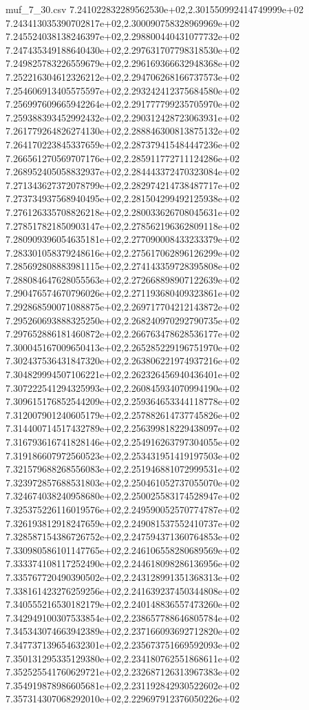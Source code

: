 \begin{filecontents*}{muf_7_30.csv}
7.241022832289562530e+02,2.301550992414749999e+02
7.243413035390702817e+02,2.300090758328969969e+02
7.245524038138246397e+02,2.298800440431077732e+02
7.247435349188640430e+02,2.297631707798318530e+02
7.249825783226559679e+02,2.296169366632948368e+02
7.252216304612326212e+02,2.294706268166737573e+02
7.254606913405575597e+02,2.293242412375684580e+02
7.256997609665942264e+02,2.291777799235705970e+02
7.259388393452992432e+02,2.290312428723063931e+02
7.261779264826274130e+02,2.288846300813875132e+02
7.264170223845337659e+02,2.287379415484447236e+02
7.266561270569707176e+02,2.285911772711124286e+02
7.268952405058832937e+02,2.284443372470323084e+02
7.271343627372078799e+02,2.282974214738487717e+02
7.273734937568940495e+02,2.281504299492125938e+02
7.276126335708826218e+02,2.280033626708045631e+02
7.278517821850903147e+02,2.278562196362809118e+02
7.280909396054635181e+02,2.277090008433233379e+02
7.283301058379248616e+02,2.275617062896126299e+02
7.285692808883981115e+02,2.274143359728395808e+02
7.288084647628055563e+02,2.272668898907122639e+02
7.290476574670796026e+02,2.271193680409323861e+02
7.292868590071088875e+02,2.269717704212143872e+02
7.295260693888325250e+02,2.268240970292790735e+02
7.297652886181460872e+02,2.266763478628536177e+02
7.300045167009650413e+02,2.265285229196751970e+02
7.302437536431847320e+02,2.263806221974937216e+02
7.304829994507106221e+02,2.262326456940436401e+02
7.307222541294325993e+02,2.260845934070994190e+02
7.309615176852544209e+02,2.259364653344118778e+02
7.312007901240605179e+02,2.257882614737745826e+02
7.314400714517432789e+02,2.256399818229438097e+02
7.316793616741828146e+02,2.254916263797304055e+02
7.319186607972560523e+02,2.253431951419197503e+02
7.321579688268556083e+02,2.251946881072999531e+02
7.323972857688531803e+02,2.250461052737055070e+02
7.324674038240958680e+02,2.250025583174528947e+02
7.325375226116019576e+02,2.249590052570774787e+02
7.326193812918247659e+02,2.249081537552410737e+02
7.328587154386726752e+02,2.247594371360764853e+02
7.330980586101147765e+02,2.246106558280689569e+02
7.333374108117252490e+02,2.244618098286136956e+02
7.335767720490390502e+02,2.243128991351368313e+02
7.338161423276259256e+02,2.241639237450344808e+02
7.340555216530182179e+02,2.240148836557473260e+02
7.342949100307533854e+02,2.238657788646805784e+02
7.345343074663942389e+02,2.237166093692712820e+02
7.347737139654632301e+02,2.235673751669592093e+02
7.350131295335129380e+02,2.234180762551868611e+02
7.352525541760629721e+02,2.232687126313967383e+02
7.354919878986605681e+02,2.231192842930522602e+02
7.357314307068292010e+02,2.229697912376050226e+02

\end{filecontents*}
